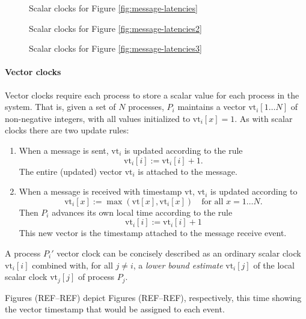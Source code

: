 \documentclass[]             %
{NASA}                       %
\theoremstyle{definition}
\begin{document}
{
 \setlength\belowcaptionskip{-3ex}
\begin{figure}[p]
  \centering 
  \caption{Scalar clocks for Figure \ref{fig:message-latencies}}
  \label{fig:message-latencies-scalar}
\end{figure}

\begin{figure}[p]
  \centering 
  \caption{Scalar clocks for Figure \ref{fig:message-latencies2}}
  \label{fig:message-latencies2-scalar}
\end{figure}

\begin{figure}[p]
  \centering 
  \caption{Scalar clocks for Figure \ref{fig:message-latencies3}}
  \label{fig:message-latencies3-scalar}
\end{figure}
\afterpage{\clearpage}
}

\paragraph{Vector clocks}
\newcommand{\vt}{\textrm{vt}}
Vector clocks require each process to store a scalar value for each
process in the system. That is, given a set of $N$ processes, $P_i$
maintains a vector $\vt_i[1 \ldots N]$ of non-negative
integers, with all values initialized to $\vt_i[x] = 1$. As
with scalar clocks there are two update rules:

\begin{enumerate}
\item When a message is sent, $\vt_i$ is updated according to the rule
  \[\vt_i[i] := \vt_i[i] + 1.\]
  The entire (updated) vector $\vt_i$ is attached to the message.
\item When a message is received with timestamp $\vt$, $\vt_i$ is updated according to
  \[\vt_i[x] := \max(\vt[x], \vt_i[x]) \quad \textrm{for all $x = 1\ldots N$}.\]
  Then $P_i$ advances its own local time according to the rule
  \[ \vt_i[i] := \vt_i[i] + 1\]
  This new vector is the timestamp attached to the message receive event.
\end{enumerate}

A process $P_i'$ vector clock can be concisely described as an
ordinary scalar clock $\vt_i[i]$ combined with, for all $j \neq i$, a
\emph{lower bound estimate} $\vt_i[j]$ of the local scalar clock
$\vt_j[j]$ of process $P_j$.

Figures (REF--REF) depict Figures (REF--REF), respectively, this time
showing the vector timestamp that would be assigned to each event.
\end{document}
